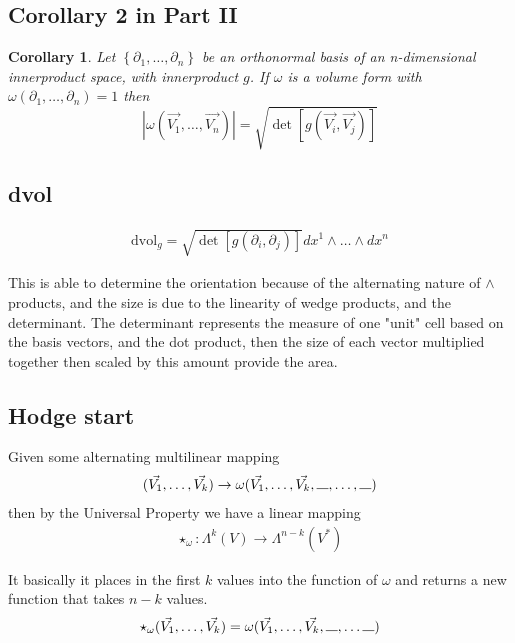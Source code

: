 \documentclass[12pt]{armath}
\newtheorem{corollary}{Corollary}[section]
\newcommand{\ra}{\rightarrow}
\newcommand{\abs}[1]{\left\vert{#1}\right\vert}
\newcommand{\dvol}{\text{dvol}_g}
\newcommand{\bs}{\rule{0.3cm}{0.15mm}}
\begin{document}
  \subsection{Corollary 2 in Part II}%
  \label{sub:corollary_2_in_part_ii}

  \begin{corollary}
    Let $\left\{\partial_1,\ldots,\partial_n\right\}$ be an orthonormal basis of
    an n-dimensional innerproduct space, with innerproduct $g$. If $\omega$ is a
    volume form with $\omega(\partial_1,\ldots,\partial_n)=1$ then
    \[
      \abs{\omega(\vec{V_1},\ldots,\vec{V_n})}=\sqrt{\det\left[g(\vec{V_i},
      \vec{V_j})\right]}
    \]
  \end{corollary}

  \subsection{dvol}%
  \label{sub:_dvol}
  \begin{align*}
    \dvol=\sqrt{\det\left[g(\partial_i,\partial_j)\right]}dx^1\wedge\ldots\wedge
    dx^n
  \end{align*}

  This is able to determine the orientation because of the alternating nature of
  $\wedge$ products, and the size is due to the linearity of wedge products, and
  the determinant. The determinant represents the measure of one "unit" cell
  based on the basis vectors, and the dot product, then the size of each vector
  multiplied together then scaled by this amount provide the area.

  \subsection{Hodge start}%
  \label{sub:hodge_start}

  Given some alternating multilinear mapping
  \begin{align*}
    (\vec{V_1},\ldots,\vec{V_k})\ra\omega(\vec{V_1},\ldots,\vec{V_k},\bs,\ldots,\bs)
  \end{align*}
  then by the Universal Property we have a linear mapping
  \begin{align*}
    \star_\omega:\Lambda^k(V)\ra\Lambda^{n-k}(V^*)
  \end{align*}

  It basically it places in the first $k$ values into the function of $\omega$
  and returns a new function that takes $n-k$ values.
  \begin{align*}
    \star_\omega(\vec{V_1},\ldots,\vec{V_k})=\omega(\vec{V_1},\ldots,\vec{V_k},\bs,\ldots\bs)
  \end{align*}
\end{document}
